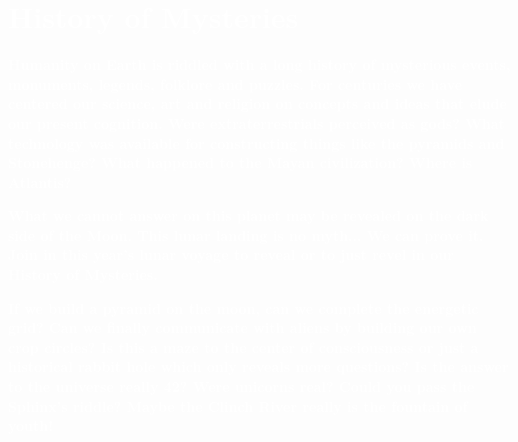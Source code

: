 
\ifisflight
  \onecolumn
\else 
  \vspace{-1cm}
\fi

\chapter*{\centering \textbf{\textcolor{white}{History of Mysteries}}}
\label{sec:theme}





\AddToShipoutPicture*{\ThemePic}

\ifisflight
  \vspace{1cm}
\fi

\textbf{\textcolor{white}{Humanity on Earth is riddled with a long history of mysterious events, monuments, legends, folklore and puzzles. For centuries we have centered our science, art and religion on concepts and ideas that elude our present cognition. Were extraterrestrials perceived as gods? What technology was available for constructing things like the pyramids and Stonehenge? What happened to the Mayan civilization? Where is Atlantis?}}

\textbf{\textcolor{white}{What we cannot answer on this planet may be revealed on  the dark side of the Moon. This lunar landing is no myth... We can prove it. Join in this year's lunar voyage to reveal or to just revel in our History of Mysteries.}}

\textbf{\textcolor{white}{If we build a pyramid on the moon, can we complete the energetic grid? Can we finally communicate with aliens by building our own crop circles? Is this a maze to the center of consciousness or just a historical rabbit hole which only reveals more questions? Is the answer to the universe really 42? Were unicorns real? Could you pass the Sphinx's riddle? Maybe the Clinch River really is the fountain of youth!}}


